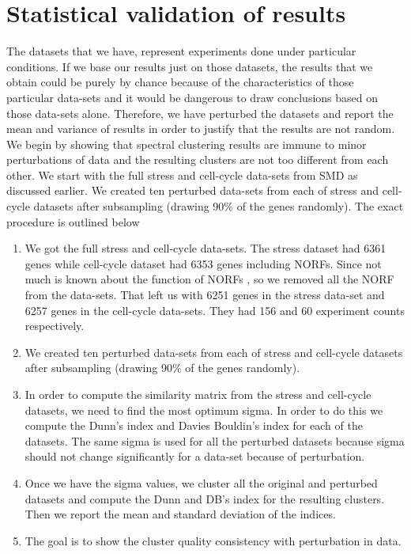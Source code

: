 \section{Statistical validation of results}
The datasets that we have, represent experiments done under particular conditions. If we base our results just on those datasets, the results that we obtain could be purely by chance because of the characteristics of those particular data-sets and it would be dangerous to draw conclusions based on those data-sets alone. 
Therefore, we have perturbed the datasets and report the mean and variance of results in order to justify that the results are not random. We begin by showing that spectral clustering results are immune to minor perturbations of data and the resulting clusters are not too different from each other. 
We start with the full stress and cell-cycle data-sets from SMD as discussed earlier. We created ten perturbed data-sets from each of stress and cell-cycle datasets after 
subsampling (drawing 90\% of the genes randomly). The exact procedure is outlined below

\begin{enumerate}
  
\item We got the full stress and cell-cycle data-sets. The stress dataset had 6361 genes while cell-cycle dataset had 6353 genes including NORFs. Since not much is known about the function of NORFs , so we removed all the NORF from the data-sets. 
That left us with 6251 genes in the stress data-set and 6257 genes in the cell-cycle data-sets. They had 156 and 60 experiment counts respectively.
 
\item We created ten perturbed data-sets from each of stress and cell-cycle datasets after subsampling (drawing 90\% of the genes randomly).

\item In order to compute the similarity matrix from the stress and cell-cycle datasets, we need to find the most optimum sigma. In order to do this we compute the Dunn’s index and Davies Bouldin’s index for each of the datasets. The same sigma is used for all the perturbed datasets because sigma should not change significantly for a data-set because of perturbation.

\item Once we have the sigma values, we cluster all the original and perturbed datasets and  compute the Dunn and DB’s index for the resulting clusters. 
Then we report the mean and standard deviation of the indices. 

\item The goal is to show the cluster quality consistency with perturbation in data. 
\end{enumerate}

